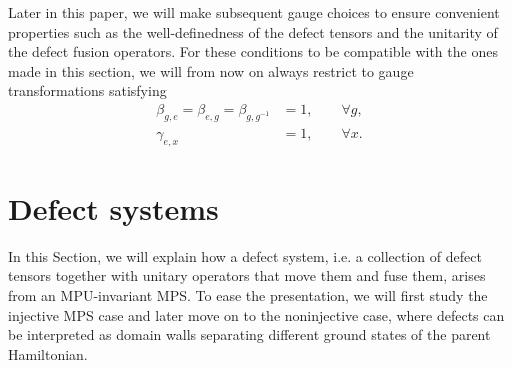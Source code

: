 \documentclass[reprint,
superscriptaddress,
amsmath,amssymb,
notitlepage,
aps,
prb,
10pt, 
tightenlines
]{revtex4-2}
\begin{document}
Later in this paper, we will make subsequent gauge choices to ensure convenient properties such as the well-definedness of the defect tensors and the unitarity of the defect fusion operators. For these conditions to be compatible with the ones made in this section, we will from now on always restrict to gauge transformations satisfying
\begin{align}
    \beta_{g,e} = \beta_{e,g} = \beta_{g,g^{-1}} &= 1, \qquad \forall g,\\
    \gamma_{e,x} &= 1, \qquad \forall x.
\end{align}

\section{Defect systems}
In this Section, we will explain how a defect system, i.e. a collection of defect tensors together with unitary operators that move them and fuse them, arises from an MPU-invariant MPS. To ease the presentation, we will first study the injective MPS case and later move on to the noninjective case, where defects can be interpreted as domain walls separating different ground states of the parent Hamiltonian.

\label{sec:defs}
\end{document}
